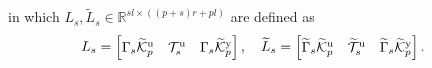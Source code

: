 in which $L_s,\widetilde{L}_s\in\mathbb{R}^{sl\times ((p+s)r+pl)}$ are defined as%
\begin{align*}
    L_s &= \begin{bmatrix} \Gamma_s\tKp{u} & \mathcal{T}_s^\mathrm{u} & \Gamma_s\tKp{y} \end{bmatrix},%
    \quad \widetilde{L}_s = \begin{bmatrix} \widetilde{\Gamma}_s\tKp{u} & \widetilde{\mathcal{T}}_s^\mathrm{u} & \widetilde{\Gamma}_s\tKp{y} \end{bmatrix}%
    .
\end{align*}

%

